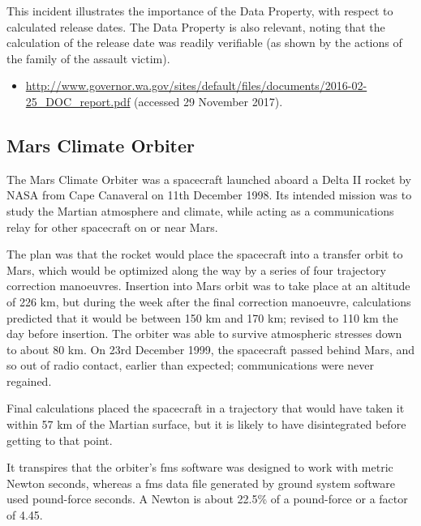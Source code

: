 This incident illustrates the importance of the  Data Property, with respect to calculated release dates. The  Data Property is also relevant, noting that the calculation of the release date was readily verifiable (as shown by the actions of the family of the assault victim).

\begin{samepage}
\begin{itemize}
	\item \raggedright{\href{http://www.governor.wa.gov/sites/default/files/documents/2016-02-25_DOC_report.pdf}{http://www.governor.wa.gov/sites/default/files/documents/2016-02-25\_DOC\_report.pdf} (accessed 29 November 2017).}
\end{itemize}
\end{samepage}


\subsection{Mars Climate Orbiter} \label{bkm:incacc:marsclimate}
The Mars Climate Orbiter was a spacecraft launched aboard a Delta II rocket by NASA from Cape Canaveral on 11th December 1998. Its intended mission was to study the Martian atmosphere and climate, while acting as a communications relay for other spacecraft on or near Mars.

The plan was that the rocket would place the spacecraft into a transfer orbit to Mars, which would be optimized along the way by a series of four trajectory correction manoeuvres. Insertion into Mars orbit was to take place at an altitude of 226 km, but during the week after the final correction manoeuvre, calculations predicted that it would be between 150 km and 170 km; revised to 110 km the day before insertion. The orbiter was able to survive atmospheric stresses down to about 80 km. On 23rd December 1999, the spacecraft passed behind Mars, and so out of radio contact, earlier than expected; communications were never regained.

Final calculations placed the spacecraft in a trajectory that would have taken it within 57 km of the Martian surface, but it is likely to have disintegrated before getting to that point. 

It transpires that the orbiter's \gls{fms} software was designed to work with metric Newton seconds, whereas a \gls{fms} \cbstart data file \cbend generated by ground system software used pound-force seconds. A Newton is about 22.5\% of a pound-force or a factor of 4.45.

